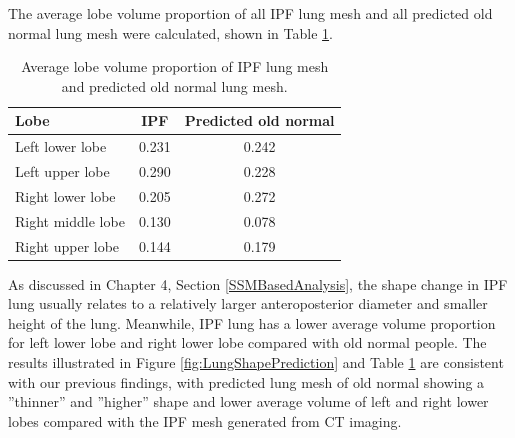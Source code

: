 The average lobe volume proportion of all IPF lung mesh and all predicted old normal lung mesh were calculated, shown in Table \ref{tab:AverageLobeVolume_Predicted}.


\begin{table}[htbp]
\centering
\caption{Average lobe volume proportion of IPF lung mesh and predicted old normal lung mesh.}
\label{tab:AverageLobeVolume_Predicted}
\begin{tabular}{| l | c | c |}
\hline
\bf{Lobe} & \bf{IPF} & \bf{Predicted old normal} \\
\hline
Left lower lobe & 0.231 & 0.242\\
\hline
Left upper lobe	& 0.290 & 0.228\\
\hline
Right lower lobe	& 0.205 & 0.272\\
\hline
Right middle lobe	& 0.130 & 0.078\\
\hline
Right upper lobe	& 0.144 & 0.179\\
\hline
\end{tabular}
\end{table}

As discussed in Chapter 4, Section \ref{SSMBasedAnalysis}, the shape change in IPF lung usually relates to a relatively larger anteroposterior diameter and smaller height of the lung. Meanwhile, IPF lung has a lower average volume proportion for left lower lobe and right lower lobe compared with old normal people. The results illustrated in Figure \ref{fig:LungShapePrediction} and Table \ref{tab:AverageLobeVolume_Predicted} are consistent with our previous findings, with predicted lung mesh of old normal showing a ''thinner'' and ''higher'' shape and lower average volume of left and right lower lobes compared with the IPF mesh generated from CT imaging. 

